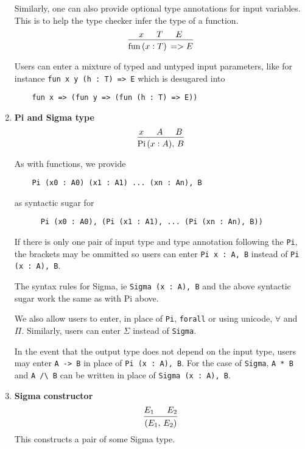 \documentclass{article}
\begin{document}
\begin{enumerate}
  Similarly, one can also provide optional type annotations for input variables.
  This is to help the type checker infer the type of a function.
  \[
    \begin{prooftree}
      \hypo{x}
      \hypo{T}
      \hypo{E}
      \infer3{\fun \, (x : T) \, => E}
    \end{prooftree}
  \]

  Users can enter a mixture of typed and untyped input parameters, like for
  instance \verb|fun x y (h : T) => E|
  which is desugared into 
  \begin{verbatim}
    fun x => (fun y => (fun (h : T) => E))
  \end{verbatim}

\item \textbf{Pi and Sigma type} \\
  \[
    \begin{prooftree}
      \hypo{x}
      \hypo{A}
      \hypo{B}
      \infer3{\Pii \, (x : A), \, B}
    \end{prooftree}
 \]

  As with functions, we provide
  \begin{verbatim}
    Pi (x0 : A0) (x1 : A1) ... (xn : An), B
  \end{verbatim}

  as syntactic sugar for

  \begin{verbatim}
      Pi (x0 : A0), (Pi (x1 : A1), ... (Pi (xn : An), B))
  \end{verbatim}

  If there is only one pair of input type and type annotation following the \verb|Pi|,
  the brackets may be ommitted so users can enter \verb|Pi x : A, B| instead of
  \verb|Pi (x : A), B|.

  The syntax rules for Sigma, ie \verb|Sigma (x : A), B| and the above syntactic
  sugar work the same as with Pi above. 

  We also allow users to enter, in place of \verb|Pi|, \verb|forall| or using
  unicode, $\forall$ and $\Pi$.
  Similarly, users can enter $\Sigma$ instead of \verb|Sigma|.

  In the event that the output type does not depend on the input type, users
  may enter \verb|A -> B| in place of \verb|Pi (x : A), B|.
  For the case of \verb|Sigma|, \verb|A * B| and \verb|A /\ B| can be written
  in place of \verb|Sigma (x : A), B|.

  \item \textbf{Sigma constructor} \\
  \[
    \begin{prooftree}
      \hypo{E_1}
      \hypo{E_2}
      \infer2{(E_1, \, E_2)}
    \end{prooftree}  
  \]
  This constructs a pair of some Sigma type.


\end{enumerate}
\end{document}
